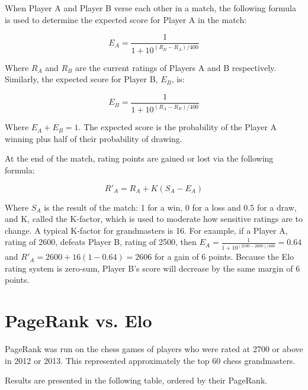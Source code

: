 \documentclass[pdftex,11pt,a4paper]{report}
\begin{document}
When Player A and Player B verse each other in a match, the following formula is used to determine the 
expected score for Player A in the match:

$$E_A = \frac{1}{1 + 10^{(R_B - R_A)/400}}$$

Where $R_A$ and $R_B$ are the current ratings of Players A and B respectively. Similarly, the expected score for Player B, $E_B$, is:

$$E_B = \frac{1}{1 + 10^{(R_A - R_B)/400}}$$

Where $E_A + E_B = 1$. The expected score is the probability of the Player A winning plus half
of their probability of drawing.

At the end of the match, rating points are gained or lost via the following formula:

$$R'_A = R_A + K(S_A - E_A)$$

Where $S_A$ is the result of the match: 1 for a win, 0 for a loss and 0.5 for a draw, and K, called the K-factor, which is used to moderate how
sensitive ratings are to change. A typical K-factor for grandmasters is 16. For example, if a Player A, rating of 2600, defeats 
Player B, rating of 2500, then $E_A = \frac{1}{1 + 10^{(2500 - 2600)/400}} = 0.64$ and $R'_A = 2600 + 16(1 - 0.64) = 2606$ for a gain of 6 points.
Because the Elo rating system is zero-sum, Player B's score will decrease by the same margin of 6 points.

\section{PageRank vs. Elo}

PageRank was run on the chess games of players who were rated at 2700 or above
in 2012 or 2013. This represented approximately the top 60 chess grandmasters.

Results are presented in the following table, ordered by their PageRank. 
\end{document}
